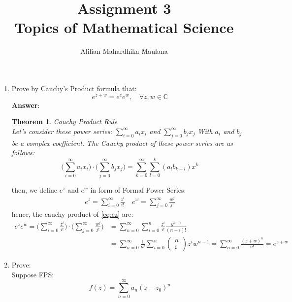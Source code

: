 \documentclass[a4paper,12pt]{article}
\title{Assignment 3\\ Topics of Mathematical Science}
\author{Alifian Mahardhika Maulana}
\newtheorem{theorem}{Theorem}
\newcommand{\C}{\mathbb{C}}
\begin{document}
\maketitle
\begin{enumerate}
	\item Prove by Cauchy's Product formula that:
	\begin{equation}
	e^{z+w} = e^z e^w,\quad \forall z,w \in \C
	\end{equation}
	\textbf{Answer}:
	\begin{theorem}Cauchy Product Rule\\
		Let's consider these power series:
		$\sum\limits_{i=0}^{\infty}a_i x_i$ and $\sum\limits_{j=0}^{\infty}b_j x_j$
		With ${a_i}$ and ${b_j}$ be a complex coefficient. The Cauchy product of these power series are as follows:
		\begin{equation}
		\bigg( \sum\limits_{i=0}^{\infty}a_i x_i \bigg) \cdot \bigg( \sum\limits_{j=0}^{\infty}b_j x_j \bigg) = \sum\limits_{k=0}^{\infty} \sum\limits_{l=0}^{k} (a_l b_{k-l})x^k
		\end{equation}
	\end{theorem}
	then, we define $e^z$ and $e^w$ in form of Formal Power Series:
	\begin{align}\label{eq:ez}
	e^z = \sum\limits_{i=0}^{\infty} \frac{z^i}{i!}  \quad	e^w = \sum\limits_{j=0}^{\infty} \frac{w^j}{j!}
	\end{align}
	hence, the cauchy product of \eqref{eq:ez} are:
	\begin{equation}\label{eq:proof1}
	\begin{aligned}
	e^ze^w = \bigg( \sum\limits_{i=0}^{\infty} \frac{z^i}{i!} \bigg)	\cdot \bigg( \sum\limits_{j=0}^{\infty} \frac{w^j}{j!} \bigg) &= \sum\limits_{n=0}^{\infty}\sum\limits_{i=0}^{n} \frac{z^i}{i!} \frac{y^{n-i}}{(n-i)!} \\
	& = \sum\limits_{n=0}^{\infty}\frac{1}{n!} \sum\limits_{i=0}^{n} \begin{pmatrix}
	n\\
	i
	\end{pmatrix} z^i w^{n-1} = \sum\limits_{n=0}^{\infty}\frac{(z+w)^n}{n!} = e^{z+w}
	\end{aligned}
	\end{equation}
	\newpage
	\item Prove:\\
	Suppose FPS:
	\begin{equation}\label{eq:fz}
	f(z) = \sum_{n=0}^{\infty} a_n(z-z_0)^n
	\end{equation}

\end{enumerate}
\end{document}
